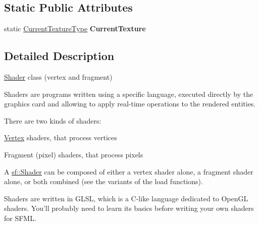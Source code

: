 \subsection*{Static Public Attributes}
\begin{DoxyCompactItemize}
\item 
\hypertarget{classsf_1_1_shader_ac84c7953eec2e19358ea6e2cc5385b8d}{static \hyperlink{structsf_1_1_shader_1_1_current_texture_type}{Current\+Texture\+Type} {\bfseries Current\+Texture}}\label{classsf_1_1_shader_ac84c7953eec2e19358ea6e2cc5385b8d}

\end{DoxyCompactItemize}


\subsection{Detailed Description}
\hyperlink{classsf_1_1_shader}{Shader} class (vertex and fragment) 

Shaders are programs written using a specific language, executed directly by the graphics card and allowing to apply real-\/time operations to the rendered entities.

There are two kinds of shaders\+: \begin{DoxyItemize}
\item \hyperlink{classsf_1_1_vertex}{Vertex} shaders, that process vertices \item Fragment (pixel) shaders, that process pixels\end{DoxyItemize}
A \hyperlink{classsf_1_1_shader}{sf\+::\+Shader} can be composed of either a vertex shader alone, a fragment shader alone, or both combined (see the variants of the load functions).

Shaders are written in G\+L\+S\+L, which is a C-\/like language dedicated to Open\+G\+L shaders. You'll probably need to learn its basics before writing your own shaders for S\+F\+M\+L.

